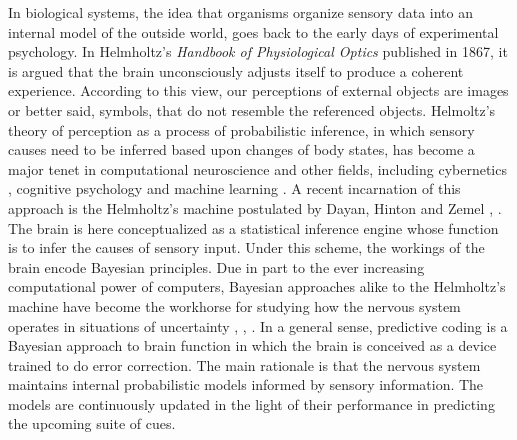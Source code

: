 \documentclass[11pt, onecolumn]{article}
\begin{document}
In biological systems, the idea that organisms organize sensory data into an internal model of the outside world, goes back to the early days of experimental psychology. In Helmholtz's \emph{Handbook of Physiological Optics} published in 1867, it is argued that the brain unconsciously adjusts itself to produce a coherent experience. According to this view, our perceptions of external objects are images or better said, symbols, that do not resemble the referenced objects.  Helmoltz's theory of perception as a process of probabilistic inference, in which sensory causes need to be inferred based upon changes of body states, has become a major tenet in computational neuroscience \citep{Dayan:2002} and other fields, including cybernetics \citep{ashby_introduction_2015}, cognitive psychology \citep{neisser_cognitive_2014} and machine learning \citep{neal_view_1998}.
A recent incarnation of this approach is the Helmholtz's machine postulated by Dayan, Hinton and Zemel \citep{dayan_helmholtz_1995}, \citep{dayan_varieties_1996}. The brain is here conceptualized as a statistical inference engine whose function is to infer the causes of sensory input. 
Under this scheme, the workings of the brain encode Bayesian principles. Due in part to the ever increasing computational power of computers, Bayesian approaches alike to the Helmholtz's machine have become the workhorse for studying how the nervous system operates in situations of uncertainty \citep{rao_predictive_1999}, \citep{knill_bayesian_2004}, \citep{friston_history_2012}. 
In a general sense, predictive coding is a Bayesian approach to brain function in which the brain is conceived as a device trained to do error correction. The main rationale is that the nervous system maintains internal probabilistic models informed by sensory information. The models are continuously updated in the light of their performance in predicting the upcoming suite of cues.
\end{document}
